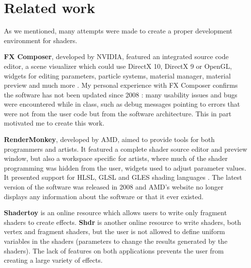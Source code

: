 \section{Related work}
As we mentioned, many attempts were made to create a proper development environment for shaders.

\textbf{FX Composer}, developed by NVIDIA, featured an integrated source code editor, a scene visualizer which could use DirectX 10, DirectX 9 or OpenGL, widgets for editing parameters, particle systems, material manager, material preview and much more \cite{fxcomposer}. My personal experience with FX Composer confirms the software has not been updated since 2008 \cite{fxcomposer_release_notes}: many usability issues and bugs were encountered while in class, such as debug messages pointing to errors that were not from the user code but from the software architecture. This in part motivated me to create this work.

\textbf{RenderMonkey}, developed by AMD, aimed to provide tools for both programmers and artists. It featured a complete shader source editor and preview window, but also a workspace specific for artists, where much of the shader programming was hidden from the user, widgets used to adjust parameter values. It presented support for HLSL, GLSL and GLES shading languages \cite{rendermonkey}. The latest version of the software was released in 2008 \cite{rendermonkey_release_notes} and AMD's website no longer displays any information about the software or that it ever existed.

\textbf{Shadertoy} is an online resource which allows users to write only fragment shaders to create effects. \textbf{Shdr} is another online resource to write shaders, both vertex and fragment shaders, but the user is not allowed to define uniform variables in the shaders (parameters to change the results generated by the shaders). The lack of features on both applications prevents the user from creating a large variety of effects.

